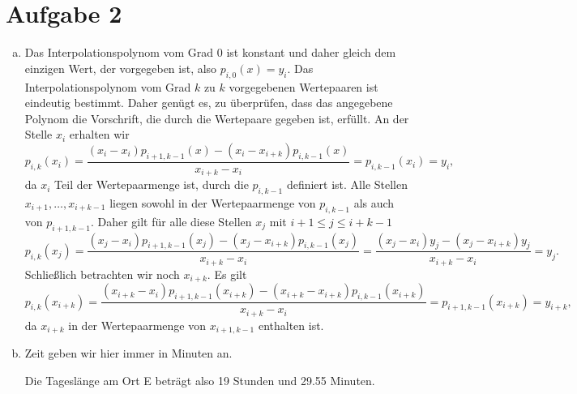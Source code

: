 \documentclass{article}
\theoremstyle{definition}
\begin{document}
\section*{Aufgabe 2}
\begin{enumerate}[(a)]
    \item Das Interpolationspolynom vom Grad 0 ist konstant und daher gleich dem einzigen Wert, der vorgegeben ist, also $p_{i,0}(x) = y_i$. Das Interpolationspolynom vom Grad $k$ zu $k$ vorgegebenen Wertepaaren ist eindeutig bestimmt. Daher genügt es, zu überprüfen, dass das angegebene Polynom die Vorschrift, die durch die Wertepaare gegeben ist, erfüllt. An der Stelle $x_i$ erhalten wir 
    \[
        p_{i,k}(x_i) = \frac{(x_i-x_i)p_{i+1,k-1}(x)-(x_i-x_{i+k})p_{i,k-1}(x)}{x_{i+k}-x_i} = p_{i,k-1}(x_i) = y_i,  
    \]
    da $x_i$ Teil der Wertepaarmenge ist, durch die $p_{i,k-1}$ definiert ist. Alle Stellen $x_{i+1},\dots, x_{i+k-1}$ liegen sowohl in der Wertepaarmenge von $p_{i,k-1}$ als auch von $p_{i+1,k-1}$. Daher gilt für alle diese Stellen $x_j$ mit $i+1\le j \le i+k-1$
    \[
        p_{i,k}(x_j) =  \frac{(x_j-x_i)p_{i+1,k-1}(x_j)-(x_j-x_{i+k})p_{i,k-1}(x_j)}{x_{i+k}-x_i} = \frac{(x_j-x_i)y_j-(x_j-x_{i+k})y_j}{x_{i+k}-x_i} = y_j.
    \]
    Schließlich betrachten wir noch $x_{i+k}$. Es gilt
    \[
        p_{i,k}(x_{i+k}) = \frac{(x_{i+k}-x_i)p_{i+1,k-1}(x_{i+k})-(x_{i+k}-x_{i+k})p_{i,k-1}(x_{i+k})}{x_{i+k}-x_i} = p_{i+1,k-1}(x_{i+k}) = y_{i+k},
    \]
    da $x_{i+k}$ in der Wertepaarmenge von $x_{i+1,k-1}$ enthalten ist.
    \item Zeit geben wir hier immer in Minuten an.\ \\

    Die Tageslänge am Ort E beträgt also 19 Stunden und 29.55 Minuten.
\end{enumerate}
\end{document}

